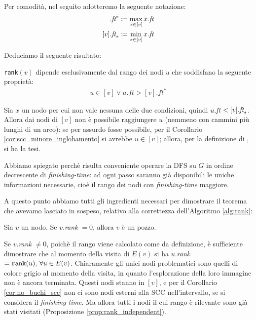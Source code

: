 Per comodità, nel seguito adotteremo la seguente notazione:
\begin{align*}
    [v].\emph{ft}^* &\coloneqq \max_{x \in [v]} x.\emph{ft}\\
    [v].\emph{ft}_* &\coloneqq \min_{x \in [v]} x.\emph{ft}
\end{align*}

Deduciamo il seguente risultato:
\begin{proposition}
    \label{prop:rank_independent}
    \verb|rank|$(v)$ dipende esclusivamente dal rango dei nodi $u$ che soddisfano la seguente proprietà:
    \begin{gather}
        u \in [v] \lor u.ft > [v].ft^* \label{rank_independency_formula}
    \end{gather}
\end{proposition}
\begin{proof2}
    Sia $x$  un nodo per cui non vale nessuna delle due condizioni, quindi $u$.\emph{ft} $< [v].\emph{ft}_*$. Allora dai nodi di $[v]$ non è possibile raggiungere $u$ (nemmeno con cammini più lunghi di un arco): se per assurdo fosse possibile, per il Corollario \ref{cor:scc_minore_inglobamento} si avrebbe $u \in [v]$; allora, per la definizione di \rankfunc, si ha la tesi.
\end{proof2}
Abbiamo spiegato perchè risulta conveniente operare la DFS su $G$ in ordine decrescente di \emph{finishing-time}: ad ogni passo saranno già disponibili le uniche informazioni necessarie, cioè il rango dei nodi con \emph{finishing-time} maggiore.

A questo punto abbiamo tutti gli ingredienti necessari per dimostrare il teorema che avevamo lasciato in sospeso, relativo alla correttezza dell'Algoritmo \ref{alg:rank}:
\begin{proof2}
    Sia $v$ un nodo. Se $v$.\emph{rank} $= 0$, allora $v$ è un pozzo.

    Se $v$.\emph{rank} $\neq 0$, poichè il rango viene calcolato come da definizione, è sufficiente dimostrare che al momento della visita di $E(v)$ si ha $u$.\emph{rank} $= \verb|rank|(u), \,\forall u \in E(v)$. Chiaramente gli unici nodi problematici sono quelli di colore grigio al momento della visita, in quanto l'esplorazione della loro immagine non è ancora terminata. Questi nodi stanno in $[v]$, e per il Corollario \ref{cor:no_buchi_scc} non ci sono nodi esterni alla SCC nell'intervallo, se si considera il \emph{finishing-time}. Ma allora tutti i nodi il cui rango è rilevante sono già stati visitati (Proposizione \ref{prop:rank_independent}).
\end{proof2}

